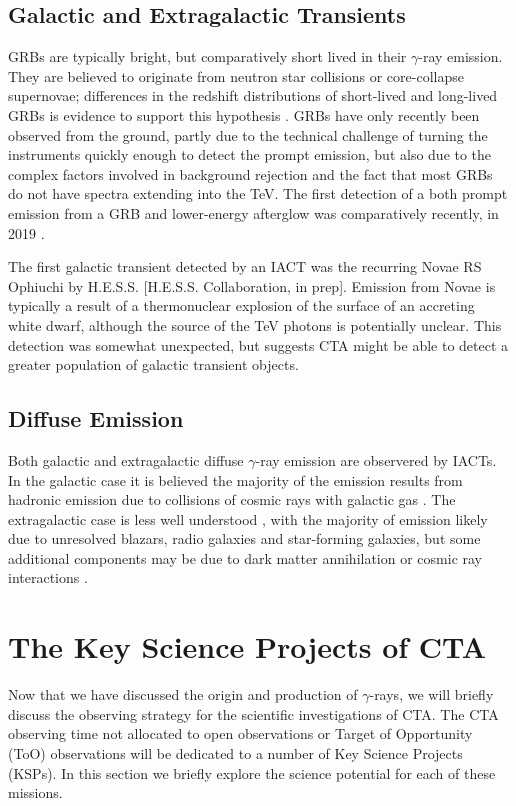 \subsection{Galactic and Extragalactic Transients}
GRBs are typically bright, but comparatively short lived in their $\gamma$-ray emission. They are believed to originate from neutron star collisions or core-collapse supernovae; differences in the redshift distributions of short-lived and long-lived GRBs is evidence to support this hypothesis \cite{longair}. GRBs have only recently been observed from the ground, partly due to the technical challenge of turning the instruments quickly enough to detect the prompt emission, but also due to the complex factors involved in background rejection and the fact that most GRBs do not have spectra extending into the TeV. The first detection of a both prompt emission from a GRB and lower-energy afterglow was comparatively recently, in 2019 \cite{magicGRB}.

The first galactic transient detected by an IACT was the recurring Novae RS Ophiuchi by H.E.S.S. [H.E.S.S. Collaboration, in prep]. Emission from Novae is typically a result of a thermonuclear explosion of the surface of an accreting white dwarf, although the source of the TeV photons is potentially unclear. This detection was somewhat unexpected, but suggests CTA might be able to detect a greater population of galactic transient objects.

\subsection{Diffuse Emission}
Both galactic and extragalactic diffuse $\gamma$-ray emission are observered by IACTs. In the galactic case it is believed the majority of the emission results from hadronic emission due to collisions of cosmic rays with galactic gas \cite{extragamma}. The extragalactic case is less well understood \cite{extragamma}, with the majority of emission likely due to unresolved blazars, radio galaxies and star-forming galaxies, but some additional components may be due to dark matter annihilation or cosmic ray interactions \cite{extragamma}.

\section{The Key Science Projects of CTA}
Now that we have discussed the origin and production of $\gamma$-rays, we will briefly discuss the observing strategy for the scientific investigations of CTA. The CTA observing time not allocated to open observations or Target of Opportunity (ToO) observations will be dedicated to a number of Key Science Projects (KSPs). In this section we briefly explore the science potential for each of these missions.

